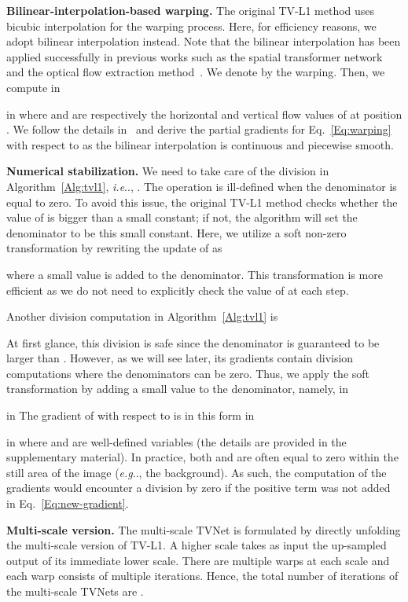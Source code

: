 \documentclass[10pt,twocolumn,letterpaper]{article}
\makeatletter
\DeclareRobustCommand\onedot{\futurelet\@let@token\@onedot}
\def\@onedot{\ifx\@let@token.\else.\null\fi\xspace}
\def\eg{\emph{e.g}\onedot} \def\Eg{\emph{E.g}\onedot}
\def\ie{\emph{i.e}\onedot} \def\Ie{\emph{I.e}\onedot}
\makeatother
\begin{document}
\textbf{Bilinear-interpolation-based warping.}
The original TV-L1 method uses bicubic interpolation for the warping process. Here, for efficiency reasons, we adopt bilinear interpolation instead. Note that the bilinear interpolation has been applied successfully in previous works such as the spatial transformer network~\cite{jaderberg2015spatial} and the optical flow extraction method~\cite{fischer2015flownet}. We denote by  the warping. Then, we compute
 in

 in \noindent
where  and  are respectively the horizontal and vertical flow values of  at position .
We  follow the details in~\cite{jaderberg2015spatial} and derive the partial gradients for Eq.~\eqref{Eq:warping} with respect to  as the bilinear interpolation is continuous and piecewise smooth.

\textbf{Numerical stabilization.}
We need to take care of the division in Algorithm~\ref{Alg:tvl1}, \ie, . The operation is ill-defined when the denominator is equal to zero.
To avoid this issue, the original TV-L1 method checks whether the value of  is bigger than a small constant; if not, the algorithm will set the denominator to be this small constant.
Here, we utilize a soft non-zero transformation by rewriting the update of  as

where a small value  is added to the denominator. This transformation is more efficient as we do not need to explicitly check the value of  at each step.

Another division computation in Algorithm~\ref{Alg:tvl1} is

At first glance, this division is safe since the denominator is guaranteed to be larger than .
However,
as we will see later, its gradients contain division computations where the denominators can be zero.
Thus, we apply the soft transformation by adding a small value  to the denominator, namely,
 in

 in \noindent
The gradient of  with respect to  is in this form
 in

 in \noindent
where  and  are well-defined variables (the details are provided in the supplementary material). In practice, both  and  are often equal to zero within the still area of the image (\eg, the background). As such, the computation of the gradients would encounter a division by zero if the positive term  was not added in Eq.~\eqref{Eq:new-gradient}. 

\textbf{Multi-scale version.} The multi-scale TVNet is formulated by directly unfolding the multi-scale version of TV-L1.
A higher scale takes as input the up-sampled output of its immediate lower scale.
There are multiple warps at each scale and each warp consists of multiple iterations.
Hence, the total number of iterations of the multi-scale TVNets are .
\end{document}

